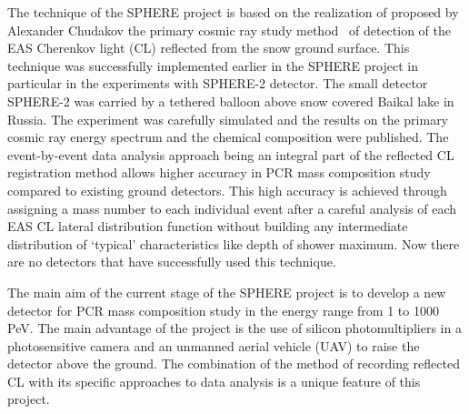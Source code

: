 \documentclass[a4paper]{jpconf}
\begin{document}
The technique of the SPHERE project is based on the realization of proposed by Alexander Chudakov the primary cosmic ray study method~\cite{Chu74} of detection of the EAS Cherenkov light (CL) reflected from the snow ground surface. This technique was successfully implemented earlier in the SPHERE project\cite{Ant15a} in particular in the experiments with SPHERE-2 detector\cite{Ant20}. The small detector SPHERE-2 was carried by a tethered balloon above snow covered Baikal lake in Russia. The experiment was carefully simulated\cite{Ant19} and the results on the primary cosmic ray energy spectrum and the chemical composition were published\cite{Ant15c}. The event-by-event data analysis approach being an integral part of the reflected CL registration method allows higher accuracy in PCR mass composition study compared to existing ground detectors. This high accuracy is achieved through assigning a mass number to each individual event after a careful analysis of each EAS CL lateral distribution function without building any intermediate distribution of `typical' characteristics like depth of shower maximum. Now there are no detectors that have successfully used this technique.

The main aim of the current stage of the SPHERE project is to develop a new detector for PCR mass composition study in the energy range from 1 to 1000 PeV. The main advantage of the project is the use of silicon photomultipliers in a photosensitive camera and an unmanned aerial vehicle (UAV) to raise the detector above the ground. The combination of the method of recording reflected CL with its specific approaches to data analysis is a unique feature of this project.
\end{document}
